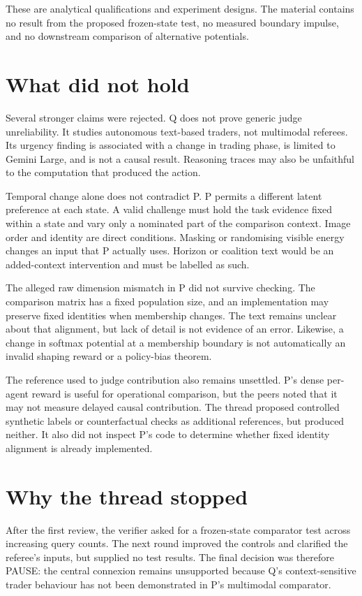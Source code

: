 \documentclass{article}
\begin{document}
These are analytical qualifications and experiment designs.  The material contains no result from the proposed frozen-state test, no measured boundary impulse, and no downstream comparison of alternative potentials.

\section{What did not hold}

Several stronger claims were rejected.  Q does not prove generic judge unreliability.  It studies autonomous text-based traders, not multimodal referees.  Its urgency finding is associated with a change in trading phase, is limited to Gemini Large, and is not a causal result.  Reasoning traces may also be unfaithful to the computation that produced the action.

Temporal change alone does not contradict P.  P permits a different latent preference at each state.  A valid challenge must hold the task evidence fixed within a state and vary only a nominated part of the comparison context.  Image order and identity are direct conditions.  Masking or randomising visible energy changes an input that P actually uses.  Horizon or coalition text would be an added-context intervention and must be labelled as such.

The alleged raw dimension mismatch in P did not survive checking.  The comparison matrix has a fixed population size, and an implementation may preserve fixed identities when membership changes.  The text remains unclear about that alignment, but lack of detail is not evidence of an error.  Likewise, a change in softmax potential at a membership boundary is not automatically an invalid shaping reward or a policy-bias theorem.

The reference used to judge contribution also remains unsettled.  P's dense per-agent reward is useful for operational comparison, but the peers noted that it may not measure delayed causal contribution.  The thread proposed controlled synthetic labels or counterfactual checks as additional references, but produced neither.  It also did not inspect P's code to determine whether fixed identity alignment is already implemented.

\section{Why the thread stopped}

After the first review, the verifier asked for a frozen-state comparator test across increasing query counts.  The next round improved the controls and clarified the referee's inputs, but supplied no test results.  The final decision was therefore PAUSE: the central connexion remains unsupported because Q's context-sensitive trader behaviour has not been demonstrated in P's multimodal comparator.
\end{document}
